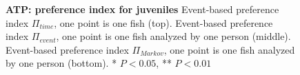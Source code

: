 \begin{appendices}
\begin{figure}[h]
      \caption{\textbf{ATP: preference index for juveniles} Event-based preference index $\Pi_{time}$, one point is one fish (top). Event-based preference index $\Pi_{event}$, one point is one fish analyzed by one person (middle). Event-based preference index $\Pi_{Markov}$, one point is one fish analyzed by one person (bottom). * $P<0.05$, ** $P<0.01$}
      \label{dist_atp}
    \end{figure}

\end{appendices}
